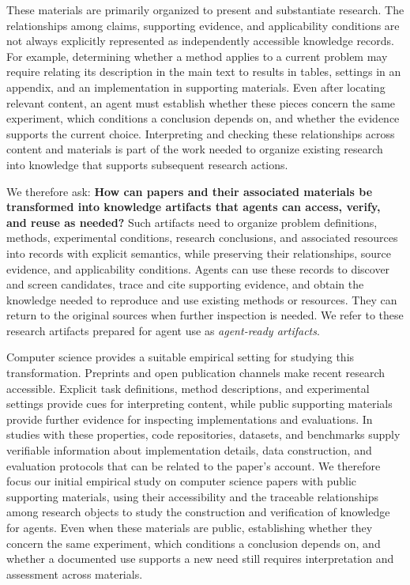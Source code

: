\documentclass[sigconf,review,anonymous]{acmart}
\begin{document}
These materials are primarily organized to present and substantiate research.
The relationships among claims, supporting evidence, and applicability
conditions are not always explicitly represented as independently accessible
knowledge records. For example, determining whether a method applies to a
current problem may require relating its description in the main text to
results in tables, settings in an appendix, and an implementation in supporting
materials. Even after locating relevant content, an agent must establish
whether these pieces concern the same experiment, which conditions a conclusion
depends on, and whether the evidence supports the current choice. Interpreting
and checking these relationships across content and materials is part of the
work needed to organize existing research into knowledge that supports
subsequent research actions.

We therefore ask: \textbf{How can papers and their associated materials be
transformed into knowledge artifacts that agents can access, verify, and reuse
as needed?} Such artifacts need to organize problem definitions, methods,
experimental conditions, research conclusions, and associated resources into
records with explicit semantics, while preserving their relationships, source
evidence, and applicability conditions. Agents can use these records to
discover and screen candidates, trace and cite supporting evidence, and obtain
the knowledge needed to reproduce and use existing methods or resources. They
can return to the original sources when further inspection is needed.
We refer to these research
artifacts prepared for agent use as \emph{agent-ready artifacts}.

Computer science provides a suitable empirical setting for studying this
transformation. Preprints and open publication channels make recent research
accessible. Explicit task definitions, method descriptions, and experimental
settings provide cues for interpreting content, while public supporting
materials provide further evidence for inspecting implementations and
evaluations. In studies with these properties, code repositories, datasets,
and benchmarks supply verifiable information about implementation details,
data construction, and evaluation protocols that can be related to the paper's
account. We therefore focus our initial empirical study on computer science
papers with public supporting materials, using their accessibility and the
traceable relationships among research objects to study the construction and
verification of knowledge for agents. Even when these materials are public,
establishing whether they concern the same experiment, which conditions a
conclusion depends on, and whether a documented use supports a new need still
requires interpretation and assessment across materials.
\end{document}
